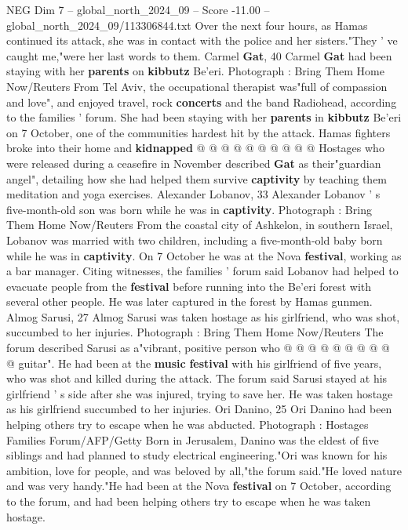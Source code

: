 \begin{textsample}{NEG Dim 7 – global\_north\_2024\_09 – Score -11.00 – global\_north\_2024\_09/113306844.txt}
Over the next four hours, as Hamas continued its attack, she was in contact with the police and her sisters."They ' ve caught me,"were her last words to them.
Carmel \textbf{Gat}, 40 Carmel \textbf{Gat} had been staying with her \textbf{parents} on \textbf{kibbutz} Be'eri.
Photograph : Bring Them Home Now/Reuters From Tel Aviv, the occupational therapist was"full of compassion and love", and enjoyed travel, rock \textbf{concerts} and the band Radiohead, according to the families ' forum.
She had been staying with her \textbf{parents} in \textbf{kibbutz} Be'eri on 7 October, one of the communities hardest hit by the attack.
Hamas fighters broke into their home and \textbf{kidnapped} @ @ @ @ @ @ @ @ @ @ Hostages who were released during a ceasefire in November described \textbf{Gat} as their"guardian angel", detailing how she had helped them survive \textbf{captivity} by teaching them meditation and yoga exercises.
Alexander Lobanov, 33 Alexander Lobanov ' s five-month-old son was born while he was in \textbf{captivity}.
Photograph : Bring Them Home Now/Reuters From the coastal city of Ashkelon, in southern Israel, Lobanov was married with two children, including a five-month-old baby born while he was in \textbf{captivity}.
On 7 October he was at the Nova \textbf{festival}, working as a bar manager.
Citing witnesses, the families ' forum said Lobanov had helped to evacuate people from the \textbf{festival} before running into the Be'eri forest with several other people.
He was later captured in the forest by Hamas gunmen.
Almog Sarusi, 27 Almog Sarusi was taken hostage as his girlfriend, who was shot, succumbed to her injuries.
Photograph : Bring Them Home Now/Reuters The forum described Sarusi as a"vibrant, positive person who @ @ @ @ @ @ @ @ @ @ guitar".
He had been at the \textbf{music} \textbf{festival} with his girlfriend of five years, who was shot and killed during the attack.
The forum said Sarusi stayed at his girlfriend ' s side after she was injured, trying to save her.
He was taken hostage as his girlfriend succumbed to her injuries.
Ori Danino, 25 Ori Danino had been helping others try to escape when he was abducted.
Photograph : Hostages Families Forum/AFP/Getty Born in Jerusalem, Danino was the eldest of five siblings and had planned to study electrical engineering."Ori was known for his ambition, love for people, and was beloved by all,"the forum said."He loved nature and was very handy."He had been at the Nova \textbf{festival} on 7 October, according to the forum, and had been helping others try to escape when he was taken hostage.

\end{textsample}
